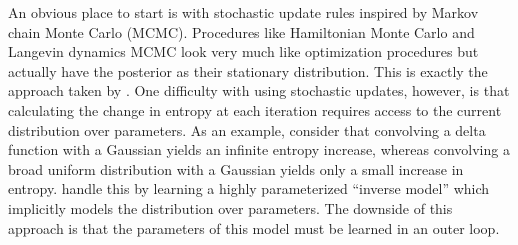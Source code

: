 \documentclass[]{article}
\begin{document}
An obvious place to start is with stochastic update rules inspired by Markov chain Monte Carlo (MCMC). 
Procedures like Hamiltonian Monte Carlo \citep{neal2011mcmc} and Langevin dynamics MCMC \citep{welling2011bayesian} look very much like optimization procedures but actually have the posterior as their stationary distribution.
This is exactly the approach taken by \citet{Bridging14}.
One difficulty with using stochastic updates, however, is that calculating the change in
entropy at each iteration requires access to the current distribution over parameters.
As an example, consider that convolving a delta function with a Gaussian yields an
infinite entropy increase, whereas convolving a broad uniform distribution with a Gaussian
yields only a small increase in entropy. \citet{welling2011bayesian} handle this
by learning a highly parameterized ``inverse model'' which implicitly models the distribution
over parameters. The downside of this approach is that the parameters of this model must be learned in an outer loop.
\end{document}
